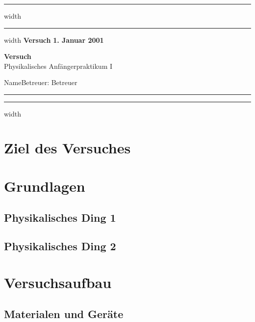 \documentclass[a4paper,12pt]{article}
\newcounter{Versuch}
\newcommand{\Datum}{\textbf{1. Januar 2001}}        %
\newcommand{\Name}{Name}                            %
\newcommand{\Versuch}{Versuch}                      %
\newcommand{\Betreuer}{Betreuer}                    %
\begin{document}
    \setcounter{Versuch}{1}             %

    
\hrule width\hsize
\vskip 0.1cm    
\hrule width\hsize
\vskip 0.3cm
\noindent
\textbf{Versuch } \hfill  \Datum
\begin{center}
{\textbf{\Versuch}} \\[1ex]
{\small{Physikalisches Anfängerpraktikum I}}
\end{center}
\Name \hfill Betreuer: \Betreuer
\vspace{2mm}\hrule
\vskip 0.1cm
\hrule width\hsize
\vspace{3mm}
\vspace{3mm}

\setcounter{tocdepth}{2}
\tableofcontents
\thispagestyle{empty}
\newpage




\section{Ziel des Versuches}
    
\section{Grundlagen}

    \subsection{Physikalisches Ding 1}

    \subsection{Physikalisches Ding 2}

\section{Versuchsaufbau}    

    \subsection{Materialen und Geräte}
\end{document}
